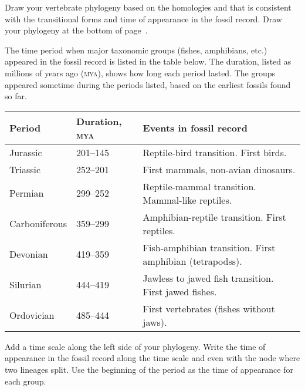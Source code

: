 \documentclass[12pt, hidelinks]{exam}
\begin{document}
\begin{questions}
\begin{longtable}[c]{@{}L{1in}C{0.75in}C{0.75in}C{1in}C{0.6in}C{0.75in}@{}}
\end{longtable}



Draw your vertebrate phylogeny based on the homologies and that is consistent with the transitional forms and time of appearance in the fossil record. Draw your phylogeny at the bottom of page~\pageref{transition_table}.


\question[Checkout]
The time period when major taxonomic groups (fishes, amphibians, etc.) appeared in the fossil record is listed in the table below. The duration, listed as millions of years ago (\textsc{mya}), shows how long each period lasted. The groups appeared sometime during the periods listed, based on the earliest fossils found so far.

\begin{longtable}[c]{@{}L{1in}L{1.35in}L{2.65in}@{}}
\toprule
Period			& Duration, \textsc{mya} 	& Events in fossil record \tabularnewline
\midrule
Jurassic		& 201–145					& Reptile-bird transition. First birds.  \tabularnewline
Triassic		& 252–201					& First mammals, non-avian dinosaurs. \tabularnewline
Permian			& 299–252					& Reptile-mammal transition. Mammal-like reptiles. \tabularnewline
Carboniferous	& 359–299					& Amphibian-reptile transition. First reptiles. \tabularnewline
Devonian		& 419–359					& Fish-amphibian transition. First amphibian (tetrapodss). \tabularnewline
Silurian		& 444–419					& Jawless to jawed fish transition. First jawed fishes. \tabularnewline
Ordovician		& 485–444					& First vertebrates (fishes without jaws). \tabularnewline
\bottomrule
\end{longtable}\label{transition_table}


Add a time scale along the left side of your phylogeny. Write the time of appearance in the fossil record along the time scale and even with the node where two lineages split. Use the beginning of the period as the time of appearance for each group.

\ifprintanswers
\medskip

\scalebox{0.93}{%
\begin{forest}
timelinetree,
timeline
[, age=485
[, age=444
  [jawless fishes]
  [, age=419
   [jawed fishes]
    [, age=359
     [,
	  [amphibians]
     ]
      [,age=299
       [
	    [mammals]
	   ]
	    [,age=201
	     [birds]
	     [reptiles]
	    ]
      ]
    ]
 ]
]]
\end{forest}
}%
\fi
\end{questions}
\end{document}
